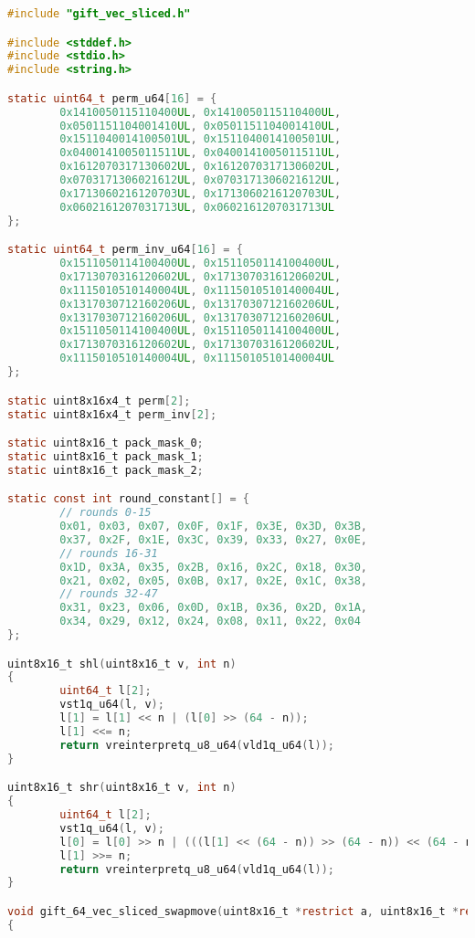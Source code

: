 \begin{lstlisting}[language=c, caption={gift\_vec\_sliced.c}]
#include "gift_vec_sliced.h"

#include <stddef.h>
#include <stdio.h>
#include <string.h>

static uint64_t perm_u64[16] = {
        0x1410050115110400UL, 0x1410050115110400UL,
        0x0501151104001410UL, 0x0501151104001410UL,
        0x1511040014100501UL, 0x1511040014100501UL,
        0x0400141005011511UL, 0x0400141005011511UL,
        0x1612070317130602UL, 0x1612070317130602UL,
        0x0703171306021612UL, 0x0703171306021612UL,
        0x1713060216120703UL, 0x1713060216120703UL,
        0x0602161207031713UL, 0x0602161207031713UL
};

static uint64_t perm_inv_u64[16] = {
        0x1511050114100400UL, 0x1511050114100400UL,
        0x1713070316120602UL, 0x1713070316120602UL,
        0x1115010510140004UL, 0x1115010510140004UL,
        0x1317030712160206UL, 0x1317030712160206UL,
        0x1317030712160206UL, 0x1317030712160206UL,
        0x1511050114100400UL, 0x1511050114100400UL,
        0x1713070316120602UL, 0x1713070316120602UL,
        0x1115010510140004UL, 0x1115010510140004UL
};

static uint8x16x4_t perm[2];
static uint8x16x4_t perm_inv[2];

static uint8x16_t pack_mask_0;
static uint8x16_t pack_mask_1;
static uint8x16_t pack_mask_2;

static const int round_constant[] = {
        // rounds 0-15
        0x01, 0x03, 0x07, 0x0F, 0x1F, 0x3E, 0x3D, 0x3B,
        0x37, 0x2F, 0x1E, 0x3C, 0x39, 0x33, 0x27, 0x0E,
        // rounds 16-31
        0x1D, 0x3A, 0x35, 0x2B, 0x16, 0x2C, 0x18, 0x30,
        0x21, 0x02, 0x05, 0x0B, 0x17, 0x2E, 0x1C, 0x38,
        // rounds 32-47
        0x31, 0x23, 0x06, 0x0D, 0x1B, 0x36, 0x2D, 0x1A,
        0x34, 0x29, 0x12, 0x24, 0x08, 0x11, 0x22, 0x04
};

uint8x16_t shl(uint8x16_t v, int n)
{
        uint64_t l[2];
        vst1q_u64(l, v);
        l[1] = l[1] << n | (l[0] >> (64 - n));
        l[1] <<= n;
        return vreinterpretq_u8_u64(vld1q_u64(l));
}

uint8x16_t shr(uint8x16_t v, int n)
{
        uint64_t l[2];
        vst1q_u64(l, v);
        l[0] = l[0] >> n | (((l[1] << (64 - n)) >> (64 - n)) << (64 - n));
        l[1] >>= n;
        return vreinterpretq_u8_u64(vld1q_u64(l));
}

void gift_64_vec_sliced_swapmove(uint8x16_t *restrict a, uint8x16_t *restrict b, uint8x16_t m, int n)
{


\end{lstlisting}
